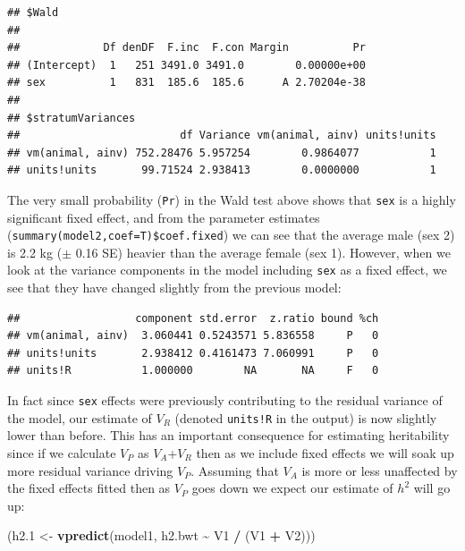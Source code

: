 \documentclass[
  12pt,
]{book}
\newenvironment{Shaded}{\begin{snugshade}}{\end{snugshade}}
\newcommand{\FloatTok}[1]{\textcolor[rgb]{0.00,0.00,0.81}{#1}}
\newcommand{\KeywordTok}[1]{\textcolor[rgb]{0.13,0.29,0.53}{\textbf{#1}}}
\newcommand{\NormalTok}[1]{#1}
\newcommand{\OperatorTok}[1]{\textcolor[rgb]{0.81,0.36,0.00}{\textbf{#1}}}
\newcommand{\StringTok}[1]{\textcolor[rgb]{0.31,0.60,0.02}{#1}}
\begin{document}
\begin{verbatim}
## $Wald
## 
##             Df denDF  F.inc  F.con Margin          Pr
## (Intercept)  1   251 3491.0 3491.0        0.00000e+00
## sex          1   831  185.6  185.6      A 2.70204e-38
## 
## $stratumVariances
##                         df Variance vm(animal, ainv) units!units
## vm(animal, ainv) 752.28476 5.957254        0.9864077           1
## units!units       99.71524 2.938413        0.0000000           1
\end{verbatim}

The very small probability (\texttt{Pr}) in the Wald test above shows that \texttt{sex} is a highly significant fixed effect, and from the parameter estimates (\texttt{summary(model2,coef=T)\$coef.fixed}) we can see that the average male (sex 2) is 2.2 kg (\(\pm\) 0.16 SE) heavier than the average female (sex 1). However, when we look at the variance components in the model including \texttt{sex} as a fixed effect, we see that they have changed slightly from the previous model:

\begin{Shaded}
\end{Shaded}

\begin{verbatim}
##                  component std.error  z.ratio bound %ch
## vm(animal, ainv)  3.060441 0.5243571 5.836558     P   0
## units!units       2.938412 0.4161473 7.060991     P   0
## units!R           1.000000        NA       NA     F   0
\end{verbatim}

In fact since \texttt{sex} effects were previously contributing to the residual variance of the model, our estimate of \(V_R\) (denoted \texttt{units!R} in the output) is now slightly lower than before. This has an important consequence for estimating heritability since if we calculate \(V_P\) as \(V_A\)+\(V_R\) then as we include fixed effects we will soak up more residual variance driving \(V_P\). Assuming that \(V_A\) is more or less unaffected by the fixed effects fitted then as \(V_P\) goes down we expect our estimate of \(h^2\) will go up:

\begin{Shaded}
\begin{Highlighting}[]
\NormalTok{(h2}\FloatTok{.1}\NormalTok{ \textless{}{-}}\StringTok{ }\KeywordTok{vpredict}\NormalTok{(model1, h2.bwt }\OperatorTok{\textasciitilde{}}\StringTok{ }\NormalTok{V1 }\OperatorTok{/}\StringTok{ }\NormalTok{(V1 }\OperatorTok{+}\StringTok{ }\NormalTok{V2)))}
\end{Highlighting}
\end{Shaded}
\end{document}
